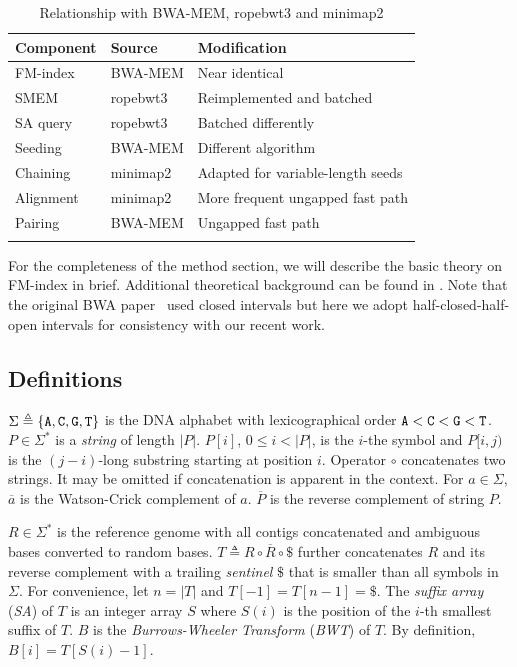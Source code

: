 \documentclass[webpdf,contemporary,large,namedate]{oup-authoring-template}%
\begin{document}
\begin{table}[t]
\caption{Relationship with BWA-MEM, ropebwt3 and minimap2\label{tab:relation}}
\begin{tabular*}{\columnwidth}{@{\extracolsep\fill}lll@{\extracolsep\fill}}
\toprule
Component & Source & Modification \\
\midrule
FM-index  & BWA-MEM  & Near identical \\
SMEM      & ropebwt3 & Reimplemented and batched \\
SA query  & ropebwt3 & Batched differently \\
Seeding   & BWA-MEM  & Different algorithm \\
Chaining  & minimap2 & Adapted for variable-length seeds \\
Alignment & minimap2 & More frequent ungapped fast path \\
Pairing   & BWA-MEM  & Ungapped fast path \\
\botrule
\end{tabular*}
\end{table}

For the completeness of the method section, we will describe the basic theory on FM-index in brief.
Additional theoretical background can be found in \citet{Li:2024ac}.
Note that the original BWA paper~\citep{Li:2009uq} used closed intervals but here we adopt half-closed-half-open intervals for consistency with our recent work.

\subsection{Definitions}

$\Sigma\triangleq\{{\tt A},{\tt C},{\tt G},{\tt T}\}$ is the DNA alphabet
with lexicographical order ${\tt A}<{\tt C}<{\tt G}<{\tt T}$.
$P\in\Sigma^*$ is a \emph{string} of length $|P|$.
$P[i]$, $0\le i<|P|$, is the $i$-the symbol and
$P[i,j)$ is the $(j-i)$-long substring starting at position $i$.
Operator $\circ$ concatenates two strings.
It may be omitted if concatenation is apparent in the context.
For $a\in\Sigma$, $\overline{a}$ is the Watson-Crick complement of $a$.
$\overline{P}$ is the reverse complement of string $P$.

$R\in\Sigma^*$ is the reference genome with all contigs concatenated and ambiguous bases converted to random bases.
$T\triangleq R\circ\overline{R}\circ\$$ further concatenates $R$ and its reverse complement
with a trailing \emph{sentinel} $\$$ that is smaller than all symbols in $\Sigma$.
For convenience, let $n=|T|$ and $T[-1]=T[n-1]=\$$.
The \emph{suffix array} (\emph{SA}) of $T$ is an integer array $S$ where
$S(i)$ is the position of the $i$-th smallest suffix of $T$.
$B$ is the \emph{Burrows-Wheeler Transform} (\emph{BWT}) of $T$.
By definition, $B[i]=T[S(i)-1]$.
\end{document}
